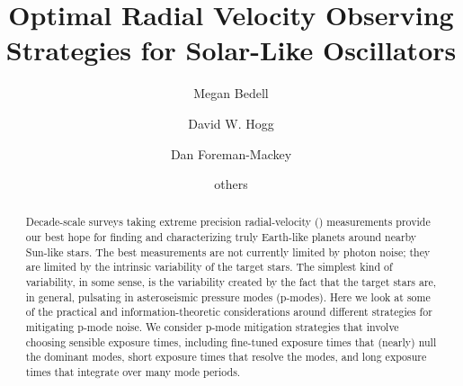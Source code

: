 \documentclass[modern]{aastex62}
\begin{document}
\sloppy\sloppypar\raggedbottom\frenchspacing %

\graphicspath{ {figures/} }

\title{Optimal Radial Velocity Observing Strategies for Solar-Like Oscillators}


\author[0000-0001-9907-7742]{Megan Bedell}
\affiliation{\flatiron}


\author[0000-0003-2866-9403]{David W. Hogg}
\affiliation{\flatiron}
\affiliation{\nyuccpp}
\affiliation{\nyucds}
\affiliation{\mpia}

\author[0000-0002-9328-5652]{Dan Foreman-Mackey}
\affiliation{\flatiron}

\author{others}


\begin{abstract}\noindent
{} 
Decade-scale surveys taking extreme precision radial-velocity (\EPRV)
measurements provide our best hope for finding and characterizing
truly Earth-like planets around nearby Sun-like stars.
The best \EPRV measurements are not currently limited by photon noise;
they are limited by the intrinsic variability of the target stars.
The simplest kind of variability, in some sense, is the variability
created by the fact that the target stars are, in general, pulsating
in asteroseismic pressure modes (p-modes).
Here we look at some of the practical and information-theoretic
considerations around different strategies for mitigating p-mode
noise.
We consider p-mode mitigation strategies that involve choosing
sensible exposure times, including fine-tuned exposure times that
(nearly) null the dominant modes, short exposure times that resolve
the modes, and long exposure times that integrate over many mode
periods.
\end{abstract}
\end{document}
